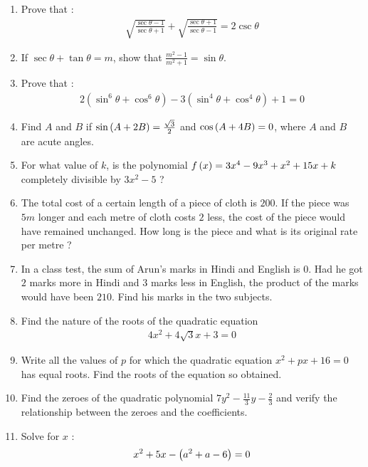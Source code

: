 \begin{enumerate}
\item Prove that :
\begin{align*}
      \sqrt{\frac{\sec\theta-1}{\sec\theta+1}} + \sqrt{\frac{\sec\theta+1}{\sec\theta-1}} = 2\csc\theta
\end{align*}

\item If $\sec\theta + \tan\theta=m$, show that $\frac{m^2-1}{m^2+1} = \sin\theta$.

\item Prove that :
\begin{align*}
    2 (\sin^6\theta +\cos^6\theta) - 3 (\sin^4\theta + \cos^4\theta) + 1 = 0
\end{align*}

\item Find $A$ and $B$ if $\sin \left(A + 2B\right)=\frac{\sqrt{3}}{2}$ and $\cos \left(A + 4B\right) = 0$, where $A$ and $B$ are acute angles.

\item For what value of $k$, is the polynomial $f\left(x\right) = 3x^4-9x^3+x^2+15x+k$ completely divisible by $3x^2 - 5$ ?

\item The total cost of a certain length of a piece of cloth is {\rupee$200$}. If the piece was $5 m$ longer and each metre of cloth costs {\rupee $2$ less}, the cost of the piece would have remained unchanged. How long is the piece and what is its original rate per metre ?

\item In a class test, the sum of Arun's marks in Hindi and English is $0$. Had he got $2$ marks more in Hindi and $3$ marks less in English, the product of the marks would have been $210$. Find his marks in the two subjects. 

\item Find the nature of the roots of the quadratic equation 
 \begin{align*}
 4x^2 + 4\sqrt{3}x +3= 0 
 \end{align*}

 \item Write all the values of $p$ for which the quadratic equation $x^2 + px + 16 = 0$ has equal roots. Find the roots of the equation so obtained.

\item Find the zeroes of the quadratic polynomial $7y^2 -\frac{11}{3}y -\frac{2}{3}$ and verify the relationship between the zeroes and the coefficients.

\item Solve for $x$ :
\begin{align*}
x^2+5x-\left(a^2 +a -6\right)=0
\end{align*}


\end{enumerate}

